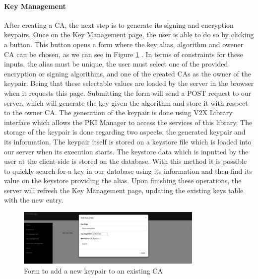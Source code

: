 \paragraph{Key Management}
After creating a CA, the next step is to generate its signing and encryption keypairs. Once on the Key Management page, the user is able to do so by clicking a button. This button opens a form where the key alias, algorithm and owener CA can be chosen, as we can see in Figure \ref{fig:manager3} . In terms of constraints for these inputs, the alias must be unique, the user must select one of the provided encryption or signing algorithms, and one of the created CAs as the owner of the keypair. Being that these selectable values are loaded by the server in the browser when it requests this page. Submitting the form will send a POST request to our server, which will generate the key given the algorithm and store it with respect to the owner CA. The generation of the keypair is done using V2X Library interface which allows the PKI Manager to access the services of this library. The storage of the keypair is done regarding two aspects, the generated keypair and its information. The keypair itself is stored on a keystore file which is loaded into our server when its execution starts. The keystore data which is inputted by the user at the client-side is stored on the database. With this method it is possible to quickly search for a key in our database using its information and then find its value on the keystore providing the alias. Upon finishing these operations, the server will refresh the Key Management page, updating the existing keys table with the new entry.

\begin{figure}
	\centering
	\includegraphics[width=0.8\textwidth]{Figures/manager3}
	\caption{\label{fig:manager3}Form to add a new keypair to an existing CA}
\end{figure}

